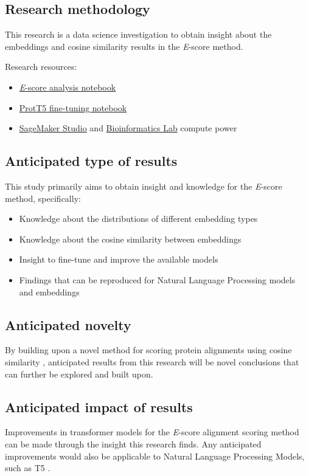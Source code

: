 \documentclass[
	letterpaper, %
	10pt, %
]{LTJournalArticle}
\begin{document}
\subsection{Research methodology}
This research is a data science investigation to obtain insight about the embeddings and cosine similarity results in the \textit{E}-score method.

\noindent Research resources:
\begin{itemize}[noitemsep]
    \item{\href{https://github.com/rgavigan/e-score}{\textit{E}-score analysis notebook}}
    \item{\href{https://github.com/agemagician/ProtTrans/tree/master/Fine-Tuning}{ProtT5 fine-tuning notebook}}
    \item{\href{https://aws.amazon.com/sagemaker/studio/}{SageMaker Studio} and \href{https://www.csd.uwo.ca/~ilie/lab.html}{Bioinformatics Lab} compute power}
\end{itemize}

\subsection{Anticipated type of results}
This study primarily aims to obtain insight and knowledge for the \textit{E}-score method, specifically:
\begin{itemize}
    \item{Knowledge about the distributions of different embedding types}
    \item{Knowledge about the cosine similarity between embeddings}
    \item{Insight to fine-tune and improve the available models}
    \item{Findings that can be reproduced for Natural Language Processing models and embeddings}
\end{itemize}

\subsection{Anticipated novelty}
By building upon a novel method for scoring protein alignments using cosine similarity \autocite{Ashrafzadeh:2023}, anticipated results from this research will be novel conclusions that can further be explored and built upon.

\subsection{Anticipated impact of results}
Improvements in transformer models for the \textit{E}-score alignment scoring method can be made through the insight this research finds. Any anticipated improvements would also be applicable to Natural Language Processing Models, such as T5 \autocite{Raffel:2020}.
\end{document}
